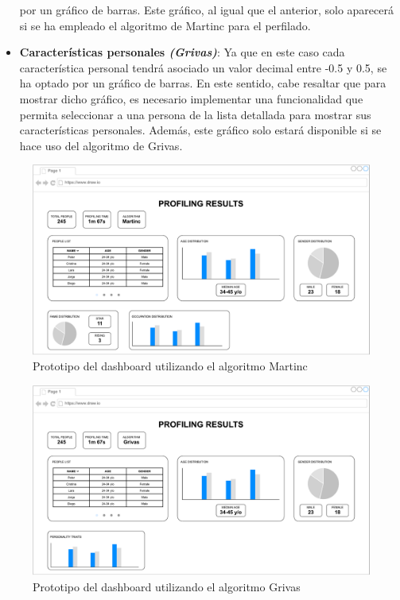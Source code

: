 \begin{itemize}
		por un gráfico de barras. Este gráfico, al igual que el anterior, solo aparecerá si se ha empleado el algoritmo de Martinc para el perfilado.
	\item \textbf{Características personales \textit{(Grivas)}}: Ya que en este caso cada característica personal tendrá asociado un valor decimal entre -0.5 y 0.5,
		se ha optado por un gráfico de barras. En este sentido, cabe resaltar que para mostrar dicho gráfico, es necesario implementar una funcionalidad que permita
		seleccionar a una persona de la lista detallada para mostrar sus características personales. Además, este gráfico solo estará disponible si se hace uso del algoritmo de Grivas.
\end{itemize}

\bigskip
\begin{figure}[H]
	\centering
	\includegraphics[width=\textwidth]{diagramas/dashboard-martinc.pdf}
	\caption{Prototipo del dashboard utilizando el algoritmo Martinc}
	\label{fig:prototipo_dashboard_martinc}
\end{figure}

\bigskip
\begin{figure}[H]
	\centering
	\includegraphics[width=\textwidth]{diagramas/dashboard-grivas.pdf}
	\caption{Prototipo del dashboard utilizando el algoritmo Grivas}
	\label{fig:prototipo_dashboard_grivas}
\end{figure}
